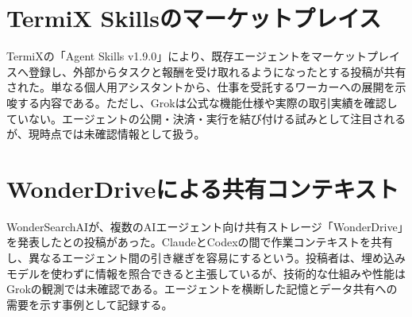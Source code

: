 \section{TermiX Skillsのマーケットプレイス}
TermiXの「Agent Skills v1.9.0」により、既存エージェントをマーケットプレイスへ登録し、外部からタスクと報酬を受け取れるようになったとする投稿が共有された。単なる個人用アシスタントから、仕事を受託するワーカーへの展開を示唆する内容である。ただし、Grokは公式な機能仕様や実際の取引実績を確認していない。エージェントの公開・決済・実行を結び付ける試みとして注目されるが、現時点では未確認情報として扱う。

\section{WonderDriveによる共有コンテキスト}
WonderSearchAIが、複数のAIエージェント向け共有ストレージ「WonderDrive」を発表したとの投稿があった。ClaudeとCodexの間で作業コンテキストを共有し、異なるエージェント間の引き継ぎを容易にするという。投稿者は、埋め込みモデルを使わずに情報を照合できると主張しているが、技術的な仕組みや性能はGrokの観測では未確認である。エージェントを横断した記憶とデータ共有への需要を示す事例として記録する。
